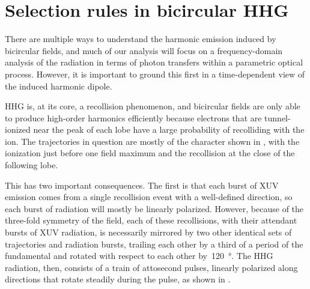 \section{Selection rules in bicircular HHG}
\label{sec:hhg-selection-rules}
There are multiple ways to understand the harmonic emission induced by bicircular fields, and much of our analysis will focus on a frequency-domain analysis of the radiation in terms of photon transfers within a parametric optical process. However, it is important to ground this first in a time-dependent view of the induced harmonic dipole.


HHG is, at its core, a recollision phenomenon, and bicircular fields are only able to produce high-order harmonics efficiently because electrons that are tunnel-ionized near the peak of each lobe have a large probability of recolliding with the ion. The trajectories in question are mostly of the  character shown in , with the ionization just before one field maximum and the recollision at the close of the following lobe. 

This has two important consequences. The first is that each burst of XUV emission comes from a single recollision event with a well-defined direction, so each burst of radiation will mostly be linearly polarized. However, because of the three-fold symmetry of the field, each of these recollisions, with their attendant bursts of XUV radiation, is necessarily mirrored by two other identical sets of trajectories and radiation bursts, trailing each other by a third of a period of the fundamental and rotated with respect to each other by~\SI{120}{\degree}. The HHG radiation, then, consists of a train of attosecond pulses, linearly polarized along directions that rotate steadily during the pulse, as shown in .






